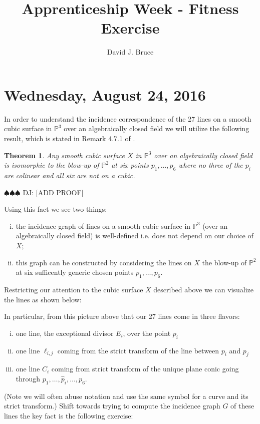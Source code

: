 \documentclass[11pt]{amsart}
\title{Apprenticeship Week - Fitness Exercise}
\author{David J. Bruce}
\newtheorem{theorem}[lemma]{Theorem}
\theoremstyle{remark}
\renewcommand{\P}{\mathbb{P}}
\newcommand{\deej}[1]{{\color{red} \sf $\spadesuit\spadesuit\spadesuit$ DJ: [#1]}}
\begin{document}
 
\maketitle
\tableofcontents


\section{Wednesday, August 24, 2016}

In order to understand the incidence correspondence of the 27 lines on a smooth cubic surface in $\P^3$ over an algebraically closed field we will utilize the following result, which is stated in Remark 4.7.1 of \cite{hartshorne}.

\begin{theorem}
Any smooth cubic surface $X$ in $\P^3$ over an algebraically closed field is isomorphic to the blow-up of $\P^2$ at six points $p_1,\ldots,p_6$ where no three of the $p_i$ are colinear and all six are not on a cubic.
\end{theorem}

\deej{ADD PROOF}

Using this fact we see two things:
\begin{enumerate}[(i)]
\item the incidence graph of lines on a smooth cubic surface in $\P^3$ (over an algebraically closed field) is well-defined i.e. does not depend on our choice of $X$;
\item this graph can be constructed by considering the lines on $X$ the blow-up of $\P^2$ at six sufficently generic chosen points $p_1,\ldots,p_6$. 
\end{enumerate}
Restricting our attention to the cubic surface $X$ described above we can visualize the lines as shown below:

In particular, from this picture above that our 27 lines come in three flavors:
\begin{enumerate}[(i)]
\item one line, the exceptional divisor $E_i$, over the point $p_i$ 
\item one line $\ell_{i,j}$ coming from the strict transform of the line between $p_i$ and $p_j$
\item one line $C_i$ coming from strict transform of the unique plane conic going through $p_1,\ldots,\hat{p}_i,\ldots,p_6$.
\end{enumerate}
(Note we will often abuse notation and use the same symbol for a curve and its strict transform.) Shift towards trying to compute the incidence graph $G$ of these lines the key fact is the following exercise:
\end{document}

